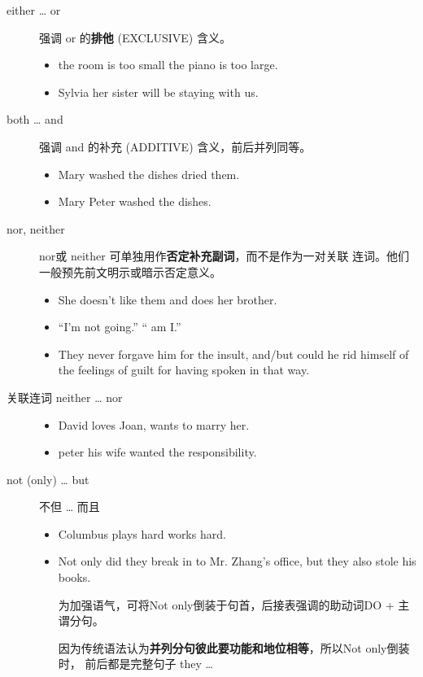 \begin{description}
\item[either \ldots{} or] 强调 or 的\textbf{排他} (EXCLUSIVE) 含义。
  \begin{itemize}
  \item {} the room is too small  the piano is too large.

  \item {} Sylvia  her sister will be staying with us.
  \end{itemize}

\item[both \ldots{} and] 强调 and 的补充 (ADDITIVE) 含义，前后并列同等。
  \begin{itemize}
  \item Mary  washed the dishes  dried them.

  \item {} Mary  Peter washed the dishes.
  \end{itemize}

\item[nor, neither] nor或 neither 可单独用作\textbf{否定补充副词}，而不是作为一对关联
  连词。他们一般预先前文明示或暗示否定意义。
  \begin{itemize}
  \item She doesn't like them and  does her brother.

  \item ``I'm not going.'' `` am I.''
  \item They never forgave him for the insult, and/but  could he rid
    himself of the feelings of guilt for having spoken in that way.
  \end{itemize}


\item[关联连词 neither \ldots{} nor]
  \begin{itemize}
  \item David  loves Joan,  wants to marry her.

  \item {} peter  his wife wanted the responsibility.
  \end{itemize}


\item[not (only) \ldots{} but] 不但 \ldots{} 而且
  \begin{itemize}
  \item Columbus  plays hard  works hard.

  \item Not only did they break in to Mr. Zhang's office, but they also stole his books.

    为加强语气，可将Not only倒装于句首，后接表强调的助动词DO + 主谓分句。

    因为传统语法认为\textbf{并列分句彼此要功能和地位相等}，所以Not only倒装时，
    前后都是完整句子 they \ldots{}
  \end{itemize}
\end{description}

